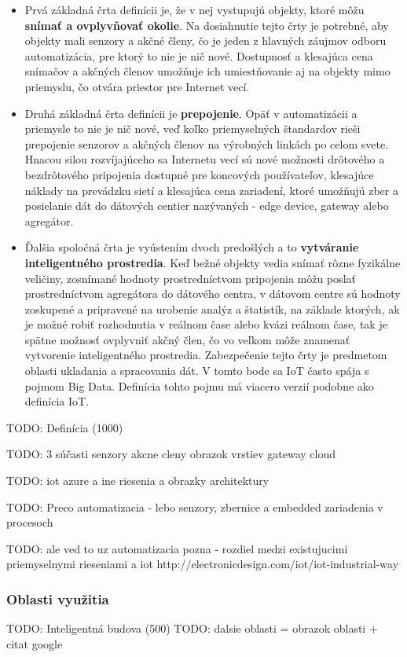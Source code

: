 \begin{itemize}
 \item Prvá základná črta definícii je, že v nej vystupujú objekty, ktoré môžu \textbf{snímať a ovplyvňovať okolie}. Na dosiahnutie tejto črty je potrebné, aby objekty mali senzory a akčné členy, čo je jeden z hlavných záujmov odboru automatizácia, pre ktorý to nie je nič nové.    Dostupnosť a klesajúca cena snímačov a akčných členov umožňuje ich umiestňovanie aj na objekty mimo priemyslu, čo otvára priestor pre Internet vecí. 
 \item Druhá základná črta definícii je \textbf{prepojenie}. Opäť v automatizácii a priemysle to nie je nič nové, veď koľko priemyselných štandardov rieši prepojenie senzorov a akčných členov na výrobných linkách po celom svete. Hnacou silou rozvíjajúceho sa Internetu vecí sú nové možnosti drôtového a bezdrôtového pripojenia dostupné pre koncových používateľov, klesajúce náklady na prevádzku sietí a klesajúca cena zariadení, ktoré umožňujú zber a posielanie dát do dátových centier nazývaných - edge device, gateway alebo agregátor.
 \item Ďalšia spoločná črta je vyústením dvoch predošlých a to \textbf{vytváranie inteligentného prostredia}. Keď bežné objekty vedia snímať rôzne fyzikálne veličiny, zosnímané hodnoty prostredníctvom pripojenia  môžu poslať prostredníctvom agregátora do dátového centra, v dátovom centre sú hodnoty zoskupené a pripravené na urobenie analýz a štatistík, na základe ktorých, ak je možné robiť rozhodnutia v reálnom čase alebo kvázi reálnom čase, tak je spätne možnosť ovplyvniť akčný člen, čo vo veľkom môže znamenať vytvorenie inteligentného prostredia. Zabezpečenie tejto črty je predmetom oblasti ukladania a spracovania dát. V tomto bode sa IoT často spája s pojmom Big Data. Definícia tohto pojmu má viacero verzií podobne ako definícia IoT. 
\end{itemize}

TODO: Definícia (1000)

TODO: 3 súčasti
senzory akcne cleny
obrazok vrstiev
gateway
cloud

TODO: iot azure a ine riesenia a obrazky architektury

TODO: Preco automatizacia - lebo senzory, zbernice a embedded zariadenia v procesoch

TODO: ale ved to uz automatizacia pozna - rozdiel  medzi existujucimi priemyselnymi rieseniami a iot
http://electronicdesign.com/iot/iot-industrial-way

\subsubsection{Oblasti využitia}
TODO: Inteligentná budova (500)
TODO: dalsie oblasti = obrazok oblasti + citat google

